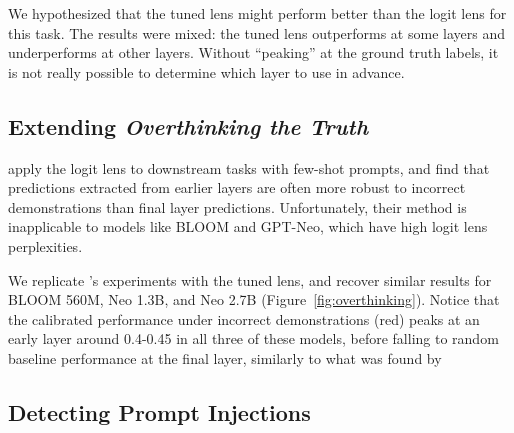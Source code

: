 \documentclass{article}
\theoremstyle{plain}
\theoremstyle{definition}
\begin{document}
We hypothesized that the tuned lens might perform better than the logit lens for this task. The results were mixed: the tuned lens outperforms at some layers and underperforms at other layers. Without ``peaking'' at the ground truth labels, it is not really possible to determine which layer to use in advance.

\subsection{Extending \emph{Overthinking the Truth}}
\label{overthinking}

\citet{halawi2023overthinking} apply the logit lens to downstream tasks with few-shot prompts, and find that predictions extracted from earlier layers are often more robust to incorrect demonstrations than final layer predictions. %
Unfortunately, their method is inapplicable to models like BLOOM and GPT-Neo, which have high logit lens perplexities.

We replicate \citet{halawi2023overthinking}'s experiments with the tuned lens, and recover similar results for BLOOM 560M, Neo 1.3B, and Neo 2.7B (Figure~\ref{fig:overthinking}). Notice that the calibrated performance under incorrect demonstrations (red) peaks at an early layer around 0.4-0.45 in all three of these models, before falling to random baseline performance at the final layer, similarly to what was found by \citeauthor{halawi2023overthinking}

\subsection{Detecting Prompt Injections}
\label{prompt-injection}
\end{document}
